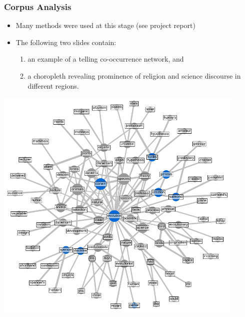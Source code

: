 \documentclass[10pt, compress]{beamer}
\begin{document}
\begin{frame}
	\frametitle{Corpus Analysis}

	\pause

  \begin{itemize}[<+- | alert@+>]
		\item Many methods were used at this stage (see project report)
		\item The following two slides contain:
		\begin{enumerate}
			\item an example of a telling co-occurrence network, and
			\item a choropleth revealing prominence of religion and science discourse in different regions.
		\end{enumerate}
	\end{itemize}

\end{frame}

\begin{frame}
	\begin{center}
		\includegraphics[width=0.9\textwidth]{images/evo_net.png}
	\end{center}

\end{frame}
\end{document}
